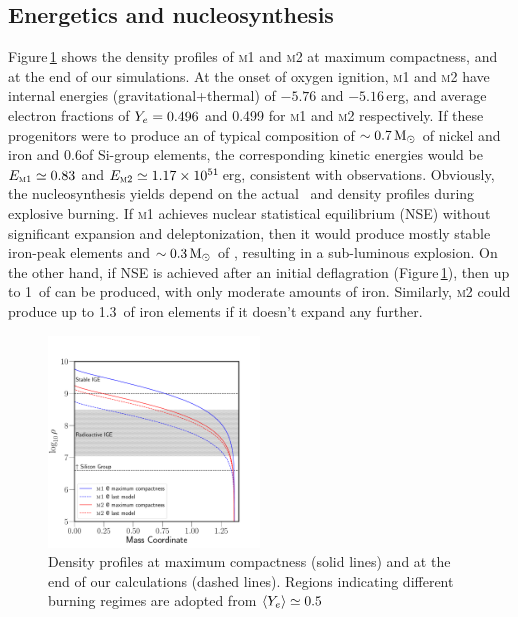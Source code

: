 \documentclass[twocolumn,tighten,times]{aastex62}
\begin{document}
\subsection{Energetics and nucleosynthesis}\label{sec:3}
Figure\,\ref{fig:nuc} shows the density profiles of \textsc{m1} and \textsc{m2} at maximum compactness, and at the end of our simulations. At the onset of oxygen ignition, \textsc{m1} and \textsc{m2} have internal energies (gravitational+thermal) of $-5.76$ and $-5.16$\,erg, and average electron fractions of $Y_e= 0.496$ and  0.499 for \textsc{m1} and \textsc{m2} respectively. If these progenitors were to produce an \ia of  typical composition of $\sim 0.7\mathrm{\,M_\odot}$ of nickel and iron and 0.6\msun of Si-group elements, the corresponding kinetic energies would be $E_{\rm \textsc{m1}}\simeq 0.83$ and $E_{\rm \textsc{m2}}\simeq 1.17\times10^{51}$\,erg, consistent with observations. 
Obviously, the nucleosynthesis yields depend on the actual
\ye\ and density profiles during explosive burning. If 
\textsc{m1} achieves nuclear statistical equilibrium (NSE)
without significant expansion and deleptonization, then it
would produce mostly stable iron-peak elements and $\sim 0.3\mathrm{\,M_\odot}$ of , resulting in a sub-luminous 
explosion. On the other hand, if NSE is achieved after an 
initial deflagration (Figure\,\ref{fig:nuc}), then up to 
1\msun\ of  can be produced, with only moderate
amounts of iron. Similarly, \textsc{m2} could produce up 
to 1.3\msun\ of iron elements if it doesn't expand any 
further. 

\begin{figure}
\begin{center}
\includegraphics[width=0.5\textwidth]{composition.pdf}
\caption{Density profiles at maximum compactness (solid lines) and at the end of our \mesa calculations (dashed lines). Regions indicating different burning regimes are adopted from $\langle Y_e\rangle\simeq0.5$}
\label{fig:nuc}
\end{center}
\end{figure}
\end{document}
